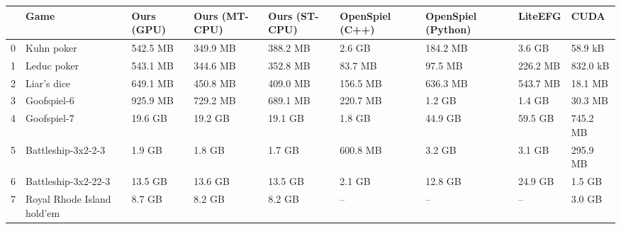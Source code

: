 \begin{tabular}{lllllllll}
\toprule
 & Game & Ours (GPU) & Ours (MT-CPU) & Ours (ST-CPU) & OpenSpiel (C++) & OpenSpiel (Python) & LiteEFG & CUDA \\
\midrule
0 & Kuhn poker & 542.5 MB & 349.9 MB & 388.2 MB & 2.6 GB & 184.2 MB & 3.6 GB & 58.9 kB \\
1 & Leduc poker & 543.1 MB & 344.6 MB & 352.8 MB & 83.7 MB & 97.5 MB & 226.2 MB & 832.0 kB \\
2 & Liar's dice & 649.1 MB & 450.8 MB & 409.0 MB & 156.5 MB & 636.3 MB & 543.7 MB & 18.1 MB \\
3 & Goofspiel-6 & 925.9 MB & 729.2 MB & 689.1 MB & 220.7 MB & 1.2 GB & 1.4 GB & 30.3 MB \\
4 & Goofspiel-7 & 19.6 GB & 19.2 GB & 19.1 GB & 1.8 GB & 44.9 GB & 59.5 GB & 745.2 MB \\
5 & Battleship-3x2-2-3 & 1.9 GB & 1.8 GB & 1.7 GB & 600.8 MB & 3.2 GB & 3.1 GB & 295.9 MB \\
6 & Battleship-3x2-22-3 & 13.5 GB & 13.6 GB & 13.5 GB & 2.1 GB & 12.8 GB & 24.9 GB & 1.5 GB \\
7 & Royal Rhode Island hold'em & 8.7 GB & 8.2 GB & 8.2 GB & -- & -- & -- & 3.0 GB \\
\bottomrule
\end{tabular}

